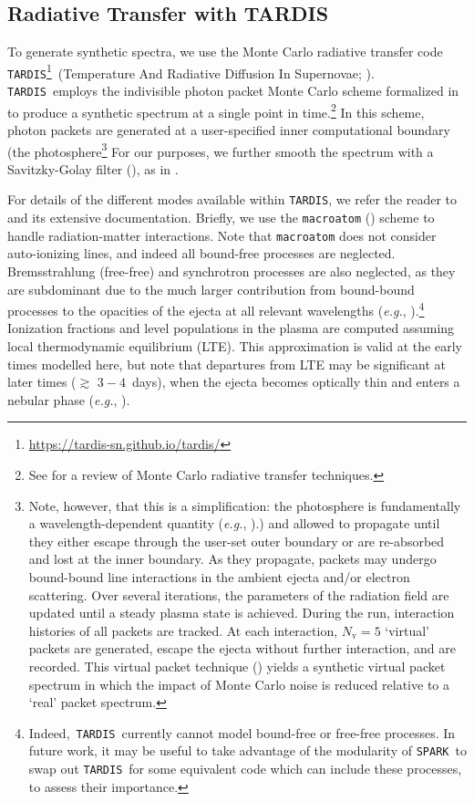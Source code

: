 \documentclass[twocolumn, twocolappendix]{aastex63}
\def\SPARK{\texttt{SPARK}}
\def\TARDIS{\texttt{TARDIS}}
\def\eg{{\it e.g.}}
\begin{document}
\subsection{Radiative Transfer with \textsc{TARDIS}}\label{ssc:TARDIS}

To generate synthetic spectra, we use the Monte Carlo radiative transfer code \TARDIS\footnote{\href{https://tardis-sn.github.io/tardis/}{https://tardis-sn.github.io/tardis/}}~(Temperature And Radiative Diffusion In Supernovae; \citealt{kerzendorf14}). \TARDIS~employs the indivisible photon packet Monte Carlo scheme formalized in \cite{mazzali93, lucy99, lucy02, lucy03} to produce a synthetic spectrum at a single point in time.\footnote{See \cite{noebauer19} for a review of Monte Carlo radiative transfer techniques.} In this scheme, photon packets are generated at a user-specified inner computational boundary (the photosphere\footnote{{Note, however, that this is a simplification: the photosphere is fundamentally a wavelength-dependent quantity (\eg, \citealt{fontes20}).}) and allowed to propagate until they either escape through the user-set outer boundary or are re-absorbed and lost at the inner boundary. As they propagate, packets may undergo bound-bound line interactions in the ambient ejecta and/or electron scattering. Over several iterations, the parameters of the radiation field are updated until a steady plasma state is achieved. During the run, interaction histories of all packets are tracked. At each interaction, $N_{\mathrm{v}} = 5$ `virtual' packets are generated, escape the ejecta without further interaction, and are recorded. This virtual packet technique (\citealt{long02}) yields a synthetic virtual packet spectrum in which the impact of Monte Carlo noise is reduced relative to a `real' packet spectrum.} For our purposes, we further smooth the spectrum with a Savitzky-Golay filter (\citealt{savitzky64}), as in \cite{vogl20}.


For details of the different modes available within \TARDIS, we refer the reader to \cite{kerzendorf14} and its extensive documentation. Briefly, we use the \texttt{macroatom} (\citealt{lucy02}) scheme to handle radiation-matter interactions. Note that \texttt{macroatom} does not consider auto-ionizing lines, and indeed all bound-free processes are neglected. Bremsstrahlung (free-free) and synchrotron processes are also neglected, as they are subdominant due to the much larger contribution from bound-bound processes to the opacities of the ejecta at all relevant wavelengths (\eg, \citealt{kasen13}).\footnote{Indeed,~\TARDIS~currently cannot model bound-free or free-free processes. In future work, it may be useful to take advantage of the modularity of \SPARK~to swap out \TARDIS~for some equivalent code which can include these processes, to assess their importance.} Ionization fractions and level populations in the plasma are computed assuming local thermodynamic equilibrium (LTE). This approximation is valid at the early times modelled here, but note that departures from LTE may be significant at later times ($\gtrsim$ $3-4$~days), when the ejecta becomes optically thin and enters a nebular phase (\eg, \citealt{gillanders21, hotokezaka21, pognan22a, pognan22b}).  
\end{document}
